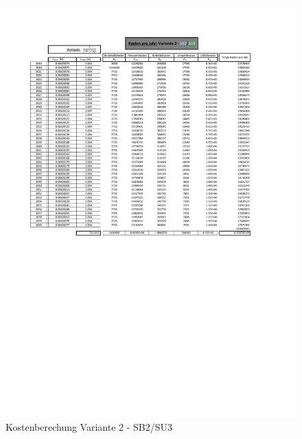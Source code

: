 \begin{figure}[h!]
	\centering
	\includegraphics[width=\textwidth]{figures/Anhang/f-00-A-V2-B2-U3}
	\caption{Kostenberechung Variante 2 - SB2/SU3}
\end{figure}

